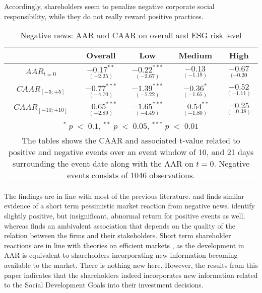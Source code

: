 Accordingly, shareholders seem to penalize negative corporate social responsibility, while they do not really reward positive practices. 

\begin{table}[H]
\centering
\caption{Negative news: AAR and CAAR on overall and ESG risk level} 
\begin{tabular}{ccccc}
  \hline  \hline
  & \multicolumn{1}{c}{Overall} &  \multicolumn{1}{c}{Low} & \multicolumn{1}{c}{Medium} & \multicolumn{1}{c}{High}\\  
 \hline
$AAR_{t=0}$ &   $\underset{(-2.25)}{-0.17^{**}}$ &   $\underset{(-2.67)}{-0.22^{***}}$ &   $\underset{(-1.18)}{-0.13}$ &   $\underset{(-0.20}{-0.67 }$ \\

$CAAR_{[-5;+5]}$  &  $\underset{(-4.70)}{-0.77^{***}}$ &   $\underset{(-5.22)}{-1.39^{***}}$ &   $\underset{(-1.65)}{-0.36^{*}}$ &   $\underset{(-1.11)}{-0.52}$ \\ 

$CAAR_{[-10;+10]}$    & $\underset{(-2.89)}{-0.65^{***}}$ &   $\underset{(-4.49)}{-1.65^{***}}$ &   $\underset{(-1.80)}{-0.54^{**}}$ &   $\underset{(-0.38)}{-0.25}$ \\ 
   \hline \hline
   \multicolumn{5}{p{12cm}}{ \footnotesize $^* \; p\; <\; 0.1$, $ ^{**} \; p\; <\; 0.05$, $ ^{***} \; p\; <\; 0.01$  } \\
   \multicolumn{5}{p{13cm}}{\footnotesize The tables shows the CAAR and associated t-value related to positive and negative events over an event window of 10, and 21 days surrounding the event date along with the AAR on $t=0$. Negative events consists of 1046 observations. } \\
   \hline
\end{tabular}
\label{tab: ST_neg_significance}
\end{table}

The findings are in line with most of the previous literature. \cite{Blancard_ESG_sentiment} and \citep{kruger2015corporate} finds similar evidence of a short term pessimistic market reaction from negative news. \citeauthor{Blancard_ESG_sentiment} identify slightly positive, but insignificant, abnormal return for positive events as well, whereas \citeauthor{kruger2015corporate} finds an ambivalent association that depends on the quality of the relation between the firms and their stakeholders. Short term shareholder reactions are in line with theories on efficient markets \citep{fama1969_EMH}, as the development in AAR is equivalent to shareholders incorporating new information becoming available to the market. There is nothing new here. However, the results from this paper indicates that the shareholders indeed incorporates new information related to the Social Development Goals into their investment decisions. 

